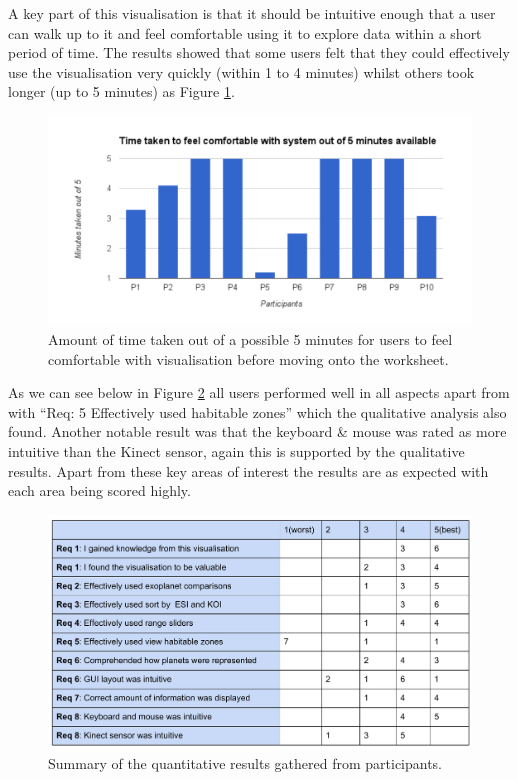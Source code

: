 A key part of this visualisation is that it should be intuitive enough that a
user can walk up to it and feel comfortable using it to explore data within a
short period of time. The results showed that some users felt that they could
effectively use the visualisation very quickly (within 1 to 4 minutes) whilst
others took longer (up to 5 minutes) as Figure \ref{fig:comfort}. 
\begin{figure}[H]
  \centering
      \includegraphics[width=1\textwidth]{images/comfort.pdf}
  \caption{Amount of time taken out of a possible 5 minutes for users to feel
comfortable with
visualisation before moving onto the worksheet. }  
\label{fig:comfort}
\end{figure}

As we can see below in Figure \ref{fig:summary} all users performed well in all
aspects apart from with ``Req: 5 Effectively used habitable zones'' which the
qualitative analysis also found. Another notable result was that the keyboard \&
mouse was rated as more intuitive than the Kinect sensor, again this is
supported by the qualitative results. Apart from these key areas of interest the
results are as expected with each area being scored highly. 
\begin{figure}[H]
\centering
      \includegraphics[width=1\textwidth]{images/summaryResults.pdf}
  \caption{Summary of the quantitative results gathered from participants.}  
    \label{fig:summary}
    \end{figure}
    
